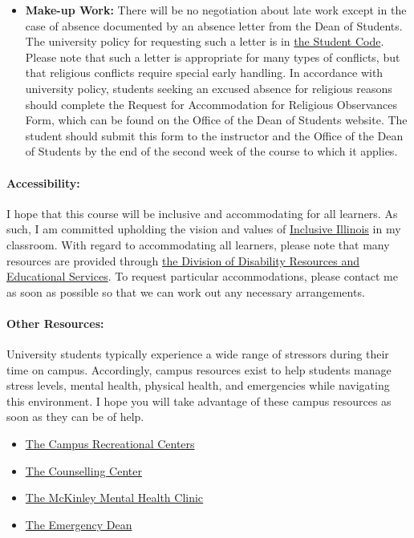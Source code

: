 \documentclass[11pt, a4paper]{article}
\begin{document}
\begin{itemize}
\item[] \textbf{Make-up Work:} There will be no negotiation about late work except in the case of absence documented by an absence letter from the Dean of Students.  The university policy for requesting such a letter is in \href{http://studentcode.illinois.edu/article1_part5_1-501.html}{the Student Code}. Please note that such a letter is appropriate for many types of conflicts, but that religious conflicts require special early handling. In accordance with university policy, students seeking an excused absence for religious reasons should complete the Request for Accommodation for Religious Observances Form, which can be found on the Office of the Dean of Students website. The student should submit this form to the instructor and the Office of the Dean of Students by the end of the second week of the course to which it applies. 

\end{itemize}

\paragraph{Accessibility:} I hope that this course will be inclusive and 
accommodating for all learners. As such, I am committed upholding the vision 
and values of \href{http://www.inclusiveillinois.illinois.edu/index.html}{Inclusive Illinois}
in my 
classroom.  With regard to accommodating all learners, please note that many 
resources are provided through 
\href{http://disability.illinois.edu/academic-support/accommodations}{the 
Division of Disability Resources and Educational Services}.  To request 
particular accommodations, please contact me as soon as possible so that we can 
work out any necessary arrangements.

\paragraph{Other Resources:} 
University students typically experience a wide range of stressors during their 
time on campus. Accordingly, campus resources exist to help students manage  
stress levels, mental health, physical health, and emergencies while navigating 
this environment. I hope you will take advantage of these campus resources as 
soon as they can be of help.

\begin{itemize}
\item \href{https://campusrec.illinois.edu/}{The Campus Recreational Centers}
\item \href{http://counselingcenter.illinois.edu/}{The Counselling Center}
\item \href{http://www.mckinley.illinois.edu/clinics/mental\_health.htm}{The McKinley Mental Health Clinic}
\item \href{http://odos.illinois.edu/emergency/}{The Emergency Dean}
\end{itemize}
\end{document}
